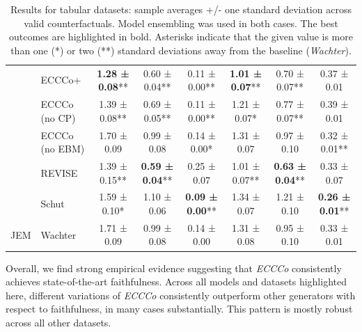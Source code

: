 \documentclass[letterpaper]{article} %
\begin{document}
\begin{table}
\begin{tabular}[t]{llcccccc}
   & ECCCo+ & \textbf{1.28 ± 0.08}** & 0.60 ± 0.04** & 0.11 ± 0.00** & \textbf{1.01 ± 0.07}** & 0.70 ± 0.07** & 0.37 ± 0.01\hphantom{*}\hphantom{*}\\
  
   & ECCCo (no CP) & 1.39 ± 0.08** & 0.69 ± 0.05** & 0.11 ± 0.00** & 1.21 ± 0.07*\hphantom{*} & 0.77 ± 0.07** & 0.39 ± 0.01\hphantom{*}\hphantom{*}\\
  
   & ECCCo (no EBM) & 1.70 ± 0.09\hphantom{*}\hphantom{*} & 0.99 ± 0.08\hphantom{*}\hphantom{*} & 0.14 ± 0.00*\hphantom{*} & 1.31 ± 0.07\hphantom{*}\hphantom{*} & 0.97 ± 0.10\hphantom{*}\hphantom{*} & 0.32 ± 0.01**\\
  
   & REVISE & 1.39 ± 0.15** & \textbf{0.59 ± 0.04}** & 0.25 ± 0.07\hphantom{*}\hphantom{*} & 1.01 ± 0.07** & \textbf{0.63 ± 0.04}** & 0.33 ± 0.07\hphantom{*}\hphantom{*}\\
  
   & Schut & 1.59 ± 0.10*\hphantom{*} & 1.10 ± 0.06\hphantom{*}\hphantom{*} & \textbf{0.09 ± 0.00}** & 1.34 ± 0.07\hphantom{*}\hphantom{*} & 1.21 ± 0.10\hphantom{*}\hphantom{*} & \textbf{0.26 ± 0.01}**\\
  
  \multirow{-7}{*}{\raggedright\arraybackslash JEM} & Wachter & 1.71 ± 0.09\hphantom{*}\hphantom{*} & 0.99 ± 0.08\hphantom{*}\hphantom{*} & 0.14 ± 0.00\hphantom{*}\hphantom{*} & 1.31 ± 0.08\hphantom{*}\hphantom{*} & 0.95 ± 0.10\hphantom{*}\hphantom{*} & 0.33 ± 0.01\hphantom{*}\hphantom{*}\\
  \bottomrule
  \end{tabular}
\caption{Results for tabular datasets: sample averages +/- one standard deviation across valid counterfactuals. Model ensembling was used in both cases. The best outcomes are highlighted in bold. Asterisks indicate that the given value is more than one (*) or two (**) standard deviations away from the baseline (\textit{Wachter}). \label{tab:results-tabular}}
\end{table}
    

Overall, we find strong empirical evidence suggesting that \textit{ECCCo} consistently achieves state-of-the-art faithfulness. Across all models and datasets highlighted here, different variations of \textit{ECCCo} consistently outperform other generators with respect to faithfulness, in many cases substantially. This pattern is mostly robust across all other datasets. 
\end{document}
